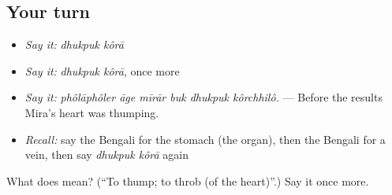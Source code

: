\subsection*{Your turn}
\begin{itemize}
\raggedright
  \item \emph{Say it:} \emph{dhukpuk kôrā}
  \item \emph{Say it:} \emph{dhukpuk kôrā}, once more
  \item \emph{Say it:} \emph{phôlāphôler āge mīrār buk dhukpuk kôrchhilô.} — Before the results Mira's heart was thumping.
  \item \emph{Recall:} say the Bengali for the stomach (the organ), then the Bengali for a vein, then say \emph{dhukpuk kôrā} again
\end{itemize}

\begin{tcolorbox}[breakable,colback=teal!4,colframe=teal!35!black,title={Before you move on}]
What does   mean? (\textquotedblleft{}To thump; to throb (of the heart)\textquotedblright{}.) Say it once more.
\end{tcolorbox}
